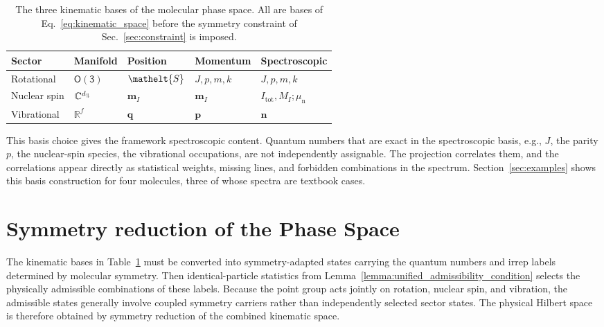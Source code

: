 \documentclass[
  reprint,
  aps,
  prx,
  superscriptaddress,
  amsmath,
  amssymb,
  longbibliography
]{revtex4-2}
\newcommand{\eltfont}[1]{{\let\sigma\eltsigma\mathelt{#1}}}
\newcommand{\grp}[1]{\mathsf{#1}}
\newcommand{\elt}[1]{\eltfont{#1}}
\newcommand{\orient}{\elt{S}}          %
\newcommand{\parity}{p}               %
\newcommand{\spin}{\mathrel{\upharpoonleft}\kern-2pt\mathrel{\downharpoonright}}
\providecommand{\spin}{\mathrel{\upharpoonleft}\kern-2pt\mathrel{\downharpoonright}}
\begin{document}
\begin{table}[htbp!]
\caption{The three kinematic bases of the molecular phase space. All are bases of Eq.~\eqref{eq:kinematic_space} before the symmetry constraint of Sec.~\ref{sec:constraint} is imposed.}
\label{tab:phase_space}
\centering
\begin{tabular}{lllll}
\toprule
Sector & Manifold & Position & Momentum & Spectroscopic\\
\midrule
Rotational   & $\grp{O(3)}$      & $\orient$        & $J,\parity,m,k$ & $J,\parity,m,k$\\
Nuclear spin & $\mathbb C^{d_{\spin}}$ & $\mathbf m_I$ & $\mathbf m_I$ & $I_{\mathrm{tot}},M_I;\mu_{\mathrm n}$\\
Vibrational  & $\mathbb R^{f}$     & $\mathbf q$    & $\mathbf p$ & $\mathbf n$\\
\bottomrule
\end{tabular}
\end{table}

This basis choice gives the framework spectroscopic content. Quantum numbers that are exact in the spectroscopic basis, e.g., $J$, the parity $\parity$, the nuclear-spin species, the vibrational occupations, are not independently assignable. The projection correlates them, and the correlations appear directly as statistical weights, missing lines, and forbidden combinations in the spectrum. Section~\ref{sec:examples} shows this basis construction for four molecules, three of whose spectra are textbook cases.









\section{Symmetry reduction of the Phase Space}
\label{sec:reduction}

The kinematic bases in Table~\ref{tab:phase_space} must be converted into symmetry-adapted states carrying the quantum numbers and irrep labels determined by molecular symmetry. Then identical-particle statistics from Lemma~\ref{lemma:unified_admissibility_condition} selects the physically admissible combinations of these labels. Because the point group acts jointly on rotation, nuclear spin, and vibration, the admissible states generally involve coupled symmetry carriers rather than independently selected sector states. The physical Hilbert space is therefore obtained by symmetry reduction of the combined kinematic space.
\end{document}
